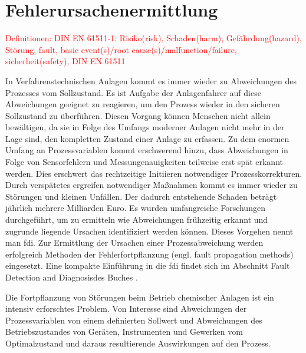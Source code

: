 \chapter{Fehlerursachenermittlung} \label{ch:fehlerfortpfl}
\textcolor{red}{Definitionen: DIN EN 61511-1: Risiko(risk), Schaden(harm), Gef\"ahrdung(hazard), St\"orung, fault, basic event(s)/root cause(s)/malfunction/failure, sicherheit(safety), DIN EN 61511 }

In Verfahrenstechnischen Anlagen kommt es immer wieder zu Abweichungen des Prozesses vom Sollzustand. Es ist Aufgabe der Anlagenfahrer auf diese Abweichungen geeignet zu reagieren, um den Prozess wieder in den sicheren Sollzustand zu \"uberf\"uhren. Diesen Vorgang k\"onnen Menschen nicht allein bew\"altigen, da sie in Folge des Umfangs moderner Anlagen nicht mehr in der Lage sind, den kompletten Zustand einer Anlage zu erfassen. Zu dem enormen Umfang an Prozessvariablen kommt erschwerend hinzu, dass Abweichungen in Folge von Sensorfehlern und Messungenauigkeiten teilweise erst sp\"at erkannt werden. Dies erschwert das rechtzeitige Initiieren notwendiger Prozesskorrekturen. Durch versp\"atetes ergreifen notwendiger Ma\ss{}nahmen kommt es immer wieder zu St\"orungen und kleinen Unf\"allen. Der dadurch entstehende Schaden betr\"agt j\"ahrlich mehrere Milliarden Euro. Es wurden umfangreiche Forschungen durchgef\"uhrt, um zu ermitteln wie Abweichungen fr\"uhzeitig erkannt und zugrunde liegende Ursachen identifiziert werden k\"onnen. Dieses Vorgehen nennt man \acf{fdi}. Zur Ermittlung der Ursachen einer Prozessabweichung werden erfolgreich Methoden der Fehlerfortpflanzung (engl. fault propagation methods) eingesetzt.  \cite[S. 2]{Venkatasubramanian_2003} \newline
Eine kompakte Einf\"uhrung in die \ac{fdi} findet sich im Abschnitt \glqq Fault Detection and Diagnosis\grqq { }des Buches  \cite[S. 417 ff.]{Baillieul_2015}.

Die Fortpflanzung von St\"orungen beim Betrieb chemischer Anlagen ist ein intensiv erforschtes Problem. Von Interesse sind Abweichungen der Prozessvariablen von einem definierten Sollwert und Abweichungen des Betriebszustandes von Ger\"aten, Instrumenten und Gewerken vom Optimalzustand und daraus resultierende Auswirkungen auf den Prozess.

